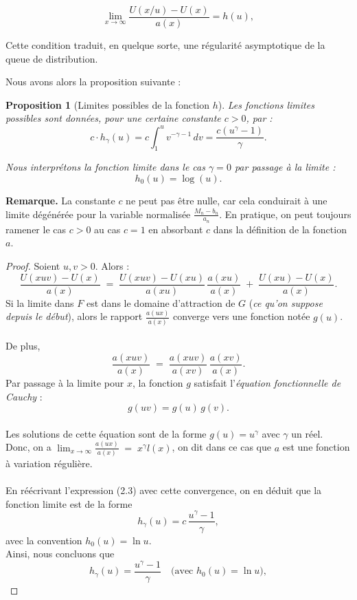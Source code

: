 \documentclass{article}
\theoremstyle{plain}
\theoremstyle{definition}
\theoremstyle{plain}
\newtheorem{proposition}[definition]{Proposition}
\begin{document}
\[
\lim_{x \to \infty} \frac{U(x/u) - U(x)}{a(x)} = h(u),
\]

Cette condition traduit, en quelque sorte, une régularité asymptotique de la queue de distribution.

\vspace{0.3cm}
\noindent
Nous avons alors la proposition suivante :

\begin{proposition}[Limites possibles de la fonction $h$]
Les fonctions limites possibles sont données, pour une certaine constante $c > 0$, par :
\[
c \cdot h_\gamma(u) = c \int_1^u v^{-\gamma - 1} \, dv = \frac{c(u^\gamma - 1)}{\gamma}.
\tag{2}
\]

Nous interprétons la fonction limite dans le cas $\gamma = 0$ par passage à la limite :
\[
h_0(u) = \log(u).
\]
\end{proposition}

\noindent
\textbf{Remarque.} La constante $c$ ne peut pas être nulle, car cela conduirait à une limite dégénérée pour la variable normalisée $\frac{M_n - b_n}{a_n}$. En pratique, on peut toujours ramener le cas $c > 0$ au cas $c = 1$ en absorbant $c$ dans la définition de la fonction $a$.
\\
\begin{proof} 
Soient $u,v >0$. Alors :
\[
\frac{U(xuv) - U(x)}{a(x)} 
\;=\; 
\frac{U(xuv) - U(xu)}{a(xu)} \,\frac{a(xu)}{a(x)}
\;+\;
\frac{U(xu) - U(x)}{a(x)}.
\tag{3}
\]
Si la limite dans $F$ est dans le domaine d'attraction de $G$ (\textit{ce qu'on suppose depuis le début}), alors le rapport $\frac{a(ux)}{a(x)}$ converge vers une fonction notée $g(u)$.
\\
\\
De plus,
\[
\frac{a(xuv)}{a(x)} 
\;=\;
\frac{a(xuv)}{a(xv)} \,\frac{a(xv)}{a(x)}.
\]
Par passage à la limite pour $x$, la fonction $g$ satisfait l'\textit{équation fonctionnelle de Cauchy} :
\[
g(uv) = g(u)\,g(v).
\]
\\
Les solutions de cette équation sont de la forme $g(u)= u^{\gamma}$ avec $\gamma$ un réel.
\\
Donc, on a $\lim_{x\to \infty} \frac{a(ux)}{a(x)} \;=\; x^{\gamma} l(x)$, on dit dans ce cas que $a$ est une fonction à variation régulière.
\\
\\
En réécrivant l'expression (2.3) avec cette convergence, on en déduit que la fonction limite est de la forme
\[
h_\gamma(u)= c\,\frac{u^\gamma-1}{\gamma},
\]
avec la convention \(h_0(u)=\ln u\).
\\
Ainsi, nous concluons que
\[
h_\gamma(u)=\frac{u^\gamma-1}{\gamma} \quad \text{(avec \(h_0(u)=\ln u\))},
\]
\end{proof}
\end{document}
